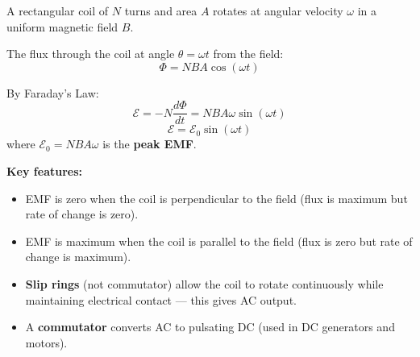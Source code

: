 \begin{processbox}
A rectangular coil of $N$ turns and area $A$ rotates
at angular velocity $\omega$ in a uniform magnetic
field $B$.

The flux through the coil at angle $\theta = \omega t$
from the field:
\[
  \Phi = NBA\cos(\omega t)
\]

By Faraday's Law:
\[
  \mathcal{E} = -N\frac{d\Phi}{dt}
  = NBA\omega\sin(\omega t)
\]
\[
  \boxed{\mathcal{E} = \mathcal{E}_0\sin(\omega t)}
\]
where $\mathcal{E}_0 = NBA\omega$ is the \textbf{peak EMF}.

\textbf{Key features:}
\begin{itemize}[noitemsep]
  \item EMF is zero when the coil is perpendicular
  to the field (flux is maximum but rate of change
  is zero).
  \item EMF is maximum when the coil is parallel to
  the field (flux is zero but rate of change is
  maximum).
  \item \textbf{Slip rings} (not commutator) allow
  the coil to rotate continuously while maintaining
  electrical contact --- this gives AC output.
  \item A \textbf{commutator} converts AC to
  pulsating DC (used in DC generators and motors).
\end{itemize}
\end{processbox}

